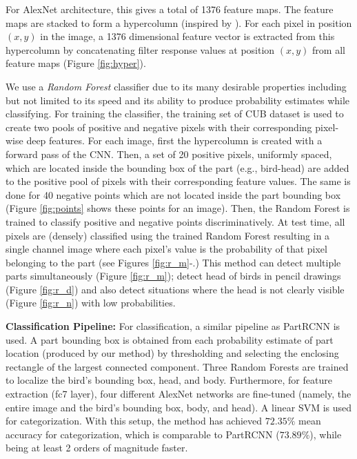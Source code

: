 \documentclass[10pt,twocolumn,letterpaper]{article}
\begin{document}
For AlexNet architecture, this gives a total of 1376 feature maps. The feature maps are stacked to form a hypercolumn (inspired by \cite{hypercolumn}). For each pixel in position $(x,y)$ in the image, a 1376 dimensional feature vector is extracted from this hypercolumn by concatenating filter response values at position $(x,y)$ from all feature maps (Figure \ref{fig:hyper}).

We use a {\it Random Forest} classifier due to its many desirable properties \cite{rf_book} including but not limited to its speed and its ability to produce probability estimates while classifying. For training the classifier, the training set of CUB \cite{cub} dataset is used to create two pools of positive and negative pixels with their corresponding pixel-wise deep features. For each image, first the hypercolumn is created with a forward pass of the CNN. Then, a set of 20 positive pixels, uniformly spaced, which are located inside the bounding box of the part (e.g., bird-head) are added to the positive pool of pixels with their corresponding feature values. The same is done for 40 negative points which are not located inside the part bounding box (Figure \ref{fig:points} shows these points for an image). Then, the Random Forest is trained to classify positive and negative points discriminatively. At test time, all pixels are (densely) classified using the trained Random Forest resulting in a single channel image where each pixel's value is the probability of that pixel belonging to the part (see Figures \ref{fig:r_m}-.) This method can detect multiple parts simultaneously (Figure \ref{fig:r_m}); detect head of birds in pencil drawings (Figure \ref{fig:r_d}) and also detect situations where the head is not clearly visible (Figure \ref{fig:r_n}) with low probabilities.

\textbf{Classification Pipeline:}
For classification, a similar pipeline as PartRCNN \cite{partrcnn} is used.
A part bounding box is obtained from each probability estimate of part location (produced by our method) by thresholding and selecting the enclosing rectangle of the largest connected component.
Three Random Forests are trained to localize the bird's bounding box, head, and body. Furthermore, for feature extraction (fc7 layer), four different AlexNet networks are fine-tuned (namely, the entire image and the bird's bounding box, body, and head). 
A linear SVM is used for categorization. With this setup, the method has achieved $72.35\%$ mean accuracy for categorization, which is comparable to PartRCNN \cite{partrcnn} ($73.89\%$), while being at least 2 orders of magnitude faster.


{\scriptsize


}
\end{document}
